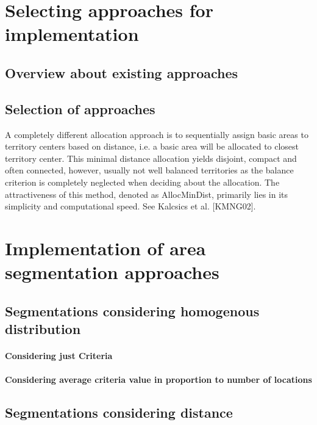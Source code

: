 \section{Selecting approaches for implementation}

\subsection{Overview about existing approaches}

\subsection{Selection of approaches}



A completely different allocation approach is to sequentially assign basic areas to territory
centers based on distance, i.e. a basic area will be allocated to closest territory center. This
minimal distance allocation yields disjoint, compact and often connected, however, usually
not well balanced territories as the balance criterion is completely neglected when deciding
about the allocation. The attractiveness of this method, denoted as AllocMinDist, primarily
lies in its simplicity and computational speed. See Kalcsics et al. [KMNG02].

\section{Implementation of area segmentation approaches}

\subsection{Segmentations considering homogenous distribution}

\paragraph{Considering just Criteria}

\paragraph{Considering average criteria value in proportion to number of locations}

\subsection{Segmentations considering distance}

